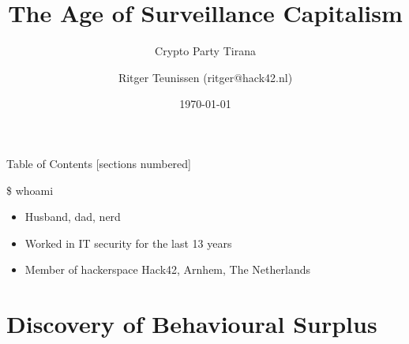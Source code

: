 \documentclass[aspectratio=169]{beamer}
\title{The Age of Surveillance Capitalism}
\subtitle{Crypto Party Tirana}
\author{Ritger Teunissen (ritger@hack42.nl)}
\institute{OpenLabs (Tirana) \& Hack42 (Arnhem)}
\date{\today}
\begin{document}
    \maketitle

    \begin{frame}{Table of Contents}
        [sections numbered]
        \tableofcontents[hideallsubsections]
    \end{frame}

    {%
    \begin{frame}{\$ whoami}
        \begin{itemize}
            \item Husband, dad, nerd
            \item Worked in IT security for the last 13 years
            \item Member of hackerspace Hack42, Arnhem, The Netherlands
        \end{itemize}
    \end{frame}
    }

    \section{Discovery of Behavioural Surplus}%
    \label{sec:discovery_of_behavioural_surplus}
\end{document}
